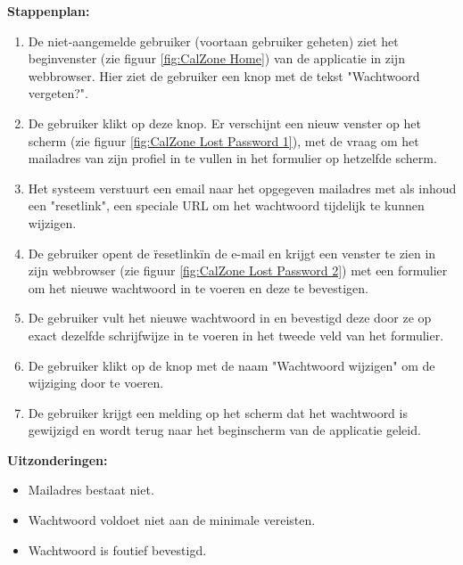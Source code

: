 \textbf{Stappenplan:}
\begin{enumerate}
\item De niet-aangemelde gebruiker (voortaan gebruiker geheten) ziet het beginvenster (zie figuur \ref{fig:CalZone Home}) van de applicatie in zijn webbrowser. Hier ziet de gebruiker een knop met de tekst "Wachtwoord vergeten?".
\item De gebruiker klikt op deze knop. Er verschijnt een nieuw venster op het scherm (zie figuur \ref{fig:CalZone Lost Password 1}), met de vraag om het mailadres van zijn profiel in te vullen in het formulier op hetzelfde scherm.
\item Het systeem verstuurt een email naar het opgegeven mailadres met als inhoud een "resetlink", een speciale URL om het wachtwoord tijdelijk te kunnen wijzigen.
\item De gebruiker opent de \"resetlink\" in de e-mail en krijgt een venster te zien in zijn webbrowser (zie figuur \ref{fig:CalZone Lost Password 2}) met een formulier om het nieuwe wachtwoord in te voeren en deze te bevestigen.
\item De gebruiker vult het nieuwe wachtwoord in en bevestigd deze door ze op exact dezelfde schrijfwijze in te voeren in het tweede veld van het formulier.
\item De gebruiker klikt op de knop met de naam "Wachtwoord wijzigen" om de wijziging door te voeren.
\item De gebruiker krijgt een melding op het scherm dat het wachtwoord is gewijzigd en wordt terug naar het beginscherm van de applicatie geleid.
\end{enumerate}

\textbf{Uitzonderingen:}
\begin{itemize}
\item Mailadres bestaat niet.
\item Wachtwoord voldoet niet aan de minimale vereisten.
\item Wachtwoord is foutief bevestigd.
\end{itemize}

